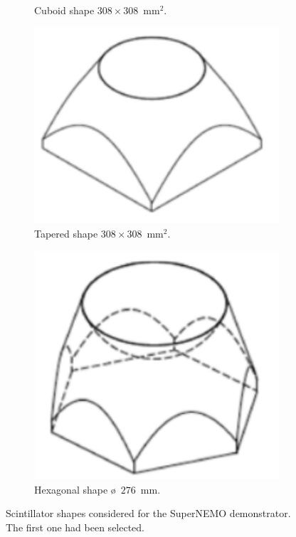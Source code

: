 \begin{figure}[!h]
\begin{subfigure}[t]{0.2\textwidth}
  \caption{Cuboid shape $308\times308$~mm$^{2}$.
    \label{subfig:square_shape}}
\end{subfigure}
\hfill
\begin{subfigure}[t]{0.2\textwidth}
  \centering
  \includegraphics[height=0.8\textwidth]{SNdemonstrator/fig_SNdemonstrator/pyramid_shape.pdf}
  \captionsetup{justification=centering}
  \caption{Tapered shape $308\times308$~mm$^{2}$.
    \label{subfig:square_shape}}
\end{subfigure}
\hfill
\begin{subfigure}[t]{0.2\textwidth}
  \centering
  \includegraphics[height=0.8\textwidth]{SNdemonstrator/fig_SNdemonstrator/bee_shape.pdf}
  \captionsetup{justification=centering}
  \caption{Hexagonal shape \o{}~$276$~mm.
    \label{subfig:square_shape}}
\end{subfigure}
\caption{Scintillator shapes considered for the SuperNEMO demonstrator.
  The first one had been selected.
  \label{fig:scint_shape}}
\end{figure}

